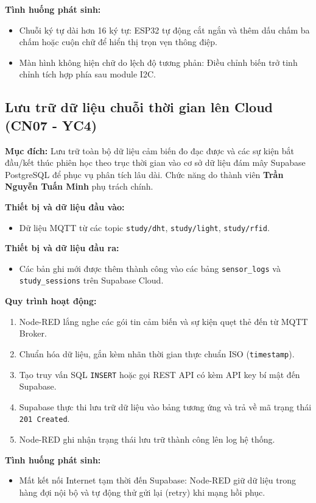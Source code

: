 \textbf{Tình huống phát sinh:}
\begin{itemize}
    \item Chuỗi ký tự dài hơn 16 ký tự: ESP32 tự động cắt ngắn và thêm dấu chấm ba chấm hoặc cuộn chữ để hiển thị trọn vẹn thông điệp.
    \item Màn hình không hiện chữ do lệch độ tương phản: Điều chỉnh biến trở tinh chỉnh tích hợp phía sau module I2C.
\end{itemize}

\subsection{Lưu trữ dữ liệu chuỗi thời gian lên Cloud (CN07 - YC4)}
\textbf{Mục đích:}
Lưu trữ toàn bộ dữ liệu cảm biến đo đạc được và các sự kiện bắt đầu/kết thúc phiên học theo trục thời gian vào cơ sở dữ liệu đám mây Supabase PostgreSQL để phục vụ phân tích lâu dài. Chức năng do thành viên \textbf{Trần Nguyễn Tuấn Minh} phụ trách chính.

\textbf{Thiết bị và dữ liệu đầu vào:}
\begin{itemize}
    \item Dữ liệu MQTT từ các topic \texttt{study/dht}, \texttt{study/light}, \texttt{study/rfid}.
\end{itemize}

\textbf{Thiết bị và dữ liệu đầu ra:}
\begin{itemize}
    \item Các bản ghi mới được thêm thành công vào các bảng \texttt{sensor\_logs} và \texttt{study\_sessions} trên Supabase Cloud.
\end{itemize}

\textbf{Quy trình hoạt động:}
\begin{enumerate}
    \item Node-RED lắng nghe các gói tin cảm biến và sự kiện quẹt thẻ đến từ MQTT Broker.
    \item Chuẩn hóa dữ liệu, gắn kèm nhãn thời gian thực chuẩn ISO (\texttt{timestamp}).
    \item Tạo truy vấn SQL \texttt{INSERT} hoặc gọi REST API có kèm API key bí mật đến Supabase.
    \item Supabase thực thi lưu trữ dữ liệu vào bảng tương ứng và trả về mã trạng thái \texttt{201 Created}.
    \item Node-RED ghi nhận trạng thái lưu trữ thành công lên log hệ thống.
\end{enumerate}

\textbf{Tình huống phát sinh:}
\begin{itemize}
    \item Mất kết nối Internet tạm thời đến Supabase: Node-RED giữ dữ liệu trong hàng đợi nội bộ và tự động thử gửi lại (retry) khi mạng hồi phục.
\end{itemize}

